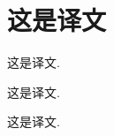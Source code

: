 \documentclass[sigconf]{acmart}
\begin{document}
	
	
	
	
	\section{这是译文}
	\label{sec:conclusion}  这是译文.
	
	这是译文.
	
	这是译文.
	
	
	
\end{document}
